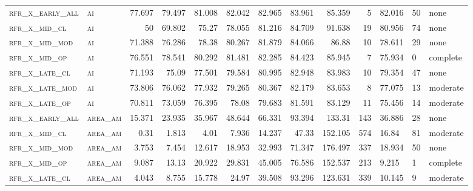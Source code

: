 \begin{landscape}
\begin{center}
\begin{footnotesize}
\begin{longtable}{llrrrrr|rrr}
\textsc{rfr\_x\_early\_all} & \textsc{ai        }   & 77.697  & 79.497  & 81.008  & 82.042   & 82.965   & 83.961   & 85.359   & 5      & 82.016        & 50            & none        \\
\textsc{rfr\_x\_mid\_cl   } & \textsc{ai        }   & 50      & 69.802  & 75.27   & 78.055   & 81.216   & 84.709   & 91.638   & 19     & 80.956        & 74            & none        \\
\textsc{rfr\_x\_mid\_mod  } & \textsc{ai        }   & 71.388  & 76.286  & 78.38   & 80.267   & 81.879   & 84.066   & 86.88    & 10     & 78.611        & 29            & none        \\
\textsc{rfr\_x\_mid\_op   } & \textsc{ai        }   & 76.551  & 78.541  & 80.292  & 81.481   & 82.285   & 84.423   & 85.945   & 7      & 75.934        & 0             & complete            \\
\textsc{rfr\_x\_late\_cl  } & \textsc{ai        }   & 71.193  & 75.09   & 77.501  & 79.584   & 80.995   & 82.948   & 83.983   & 10     & 79.354        & 47            & none        \\
\textsc{rfr\_x\_late\_mod } & \textsc{ai        }   & 73.806  & 76.062  & 77.932  & 79.265   & 80.367   & 82.179   & 83.653   & 8      & 77.075        & 13            & moderate        \\
\textsc{rfr\_x\_late\_op  } & \textsc{ai        }   & 70.811  & 73.059  & 76.395  & 78.08    & 79.683   & 81.591   & 83.129   & 11     & 75.456        & 14            & moderate        \\
\textsc{rfr\_x\_early\_all} & \textsc{area\_am  }   & 15.371  & 23.935  & 35.967  & 48.644   & 66.331   & 93.394   & 133.31   & 143    & 36.886        & 28            & none        \\
\textsc{rfr\_x\_mid\_cl   } & \textsc{area\_am  }   & 0.31    & 1.813   & 4.01    & 7.936    & 14.237   & 47.33    & 152.105  & 574    & 16.84         & 81            & moderate        \\
\textsc{rfr\_x\_mid\_mod  } & \textsc{area\_am  }   & 3.753   & 7.454   & 12.617  & 18.953   & 32.993   & 71.347   & 176.497  & 337    & 18.934        & 50            & none        \\
\textsc{rfr\_x\_mid\_op   } & \textsc{area\_am  }   & 9.087   & 13.13   & 20.922  & 29.831   & 45.005   & 76.586   & 152.537  & 213    & 9.215         & 1             & complete        \\
\textsc{rfr\_x\_late\_cl  } & \textsc{area\_am  }   & 4.043   & 8.755   & 15.778  & 24.97    & 39.508   & 93.296   & 123.631  & 339    & 10.145        & 9             & moderate        \\

\end{longtable}
\end{footnotesize}
\end{center}
\end{landscape}
